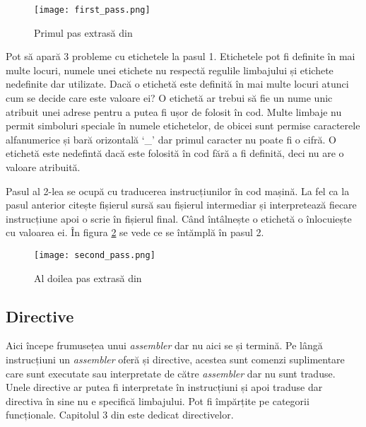 \documentclass[../main.tex]{subfiles}
\begin{document}
\begin{figure}[h]
    \centering
    \texttt{[image: first\_pass.png]}
    \caption{Primul pas extrasă din \cite{cache}}
    \label{fig:first_pass}
\end{figure}

Pot să apară 3 probleme cu etichetele la pasul 1. Etichetele pot fi definite în mai multe locuri, numele unei etichete
nu respectă regulile limbajului și etichete nedefinite dar utilizate. Dacă o etichetă este definită în mai multe locuri
atunci cum se decide care este valoare ei? O etichetă ar trebui să fie un nume unic atribuit unei adrese pentru a putea
fi ușor de folosit în cod. Multe limbaje nu permit simboluri speciale în numele etichetelor, de obicei sunt permise
caracterele alfanumerice și bară orizontală `\_' dar primul caracter nu poate fi o cifră. O etichetă este nedefintă dacă
este folosită în cod fără a fi definită, deci nu are o valoare atribuită.

Pasul al 2-lea se ocupă cu traducerea instrucțiunilor în cod mașină. La fel ca la pasul anterior citește fișierul
sursă sau fișierul intermediar și interpretează fiecare instrucțiune apoi o scrie în fișierul final. Când întâlnește
o etichetă o înlocuiește cu valoarea ei. În figura \ref{fig:second_pass} se vede ce se întămplă în pasul 2.

\begin{figure}[h]
    \centering
    \texttt{[image: second\_pass.png]}
    \caption{Al doilea pas extrasă din \cite{asl}}
    \label{fig:second_pass}
\end{figure}

\clearpage
\subsection{Directive}
Aici începe frumusețea unui \emph{assembler} dar nu aici se și termină. Pe lângă instrucțiuni un \emph{assembler} oferă
și directive, acestea sunt comenzi suplimentare care sunt executate sau interpretate de către \emph{assembler} dar nu 
sunt traduse. Unele directive ar putea fi interpretate în instrucțiuni și apoi traduse dar directiva în sine nu e
specifică limbajului. Pot fi împărțite pe categorii funcționale. Capitolul 3 din \cite{asl} este dedicat directivelor.
\end{document}
